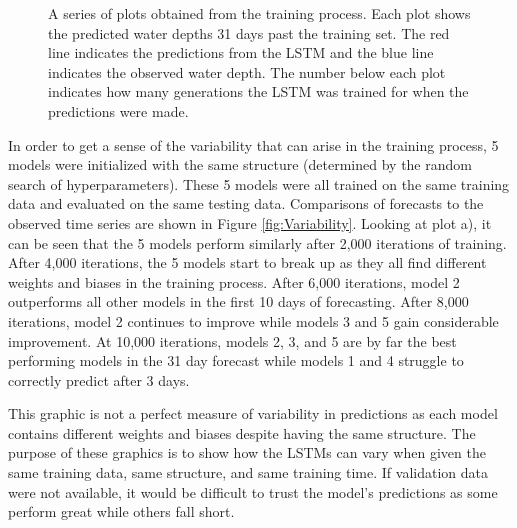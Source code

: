 \begin{figure}[ht]
    \caption{A series of plots obtained from the training process. Each plot shows the predicted water depths 31 days past the training set. The red line indicates the predictions from the LSTM and the blue line indicates the observed water depth. The number below each plot indicates how many generations the LSTM was trained for when the predictions were made.}
    \label{fig:Training}
\end{figure}

In order to get a sense of the variability that can arise in the training process, 5 models were initialized with the same structure (determined by the random search of hyperparameters). These 5 models were all trained on the same training data and evaluated on the same testing data. Comparisons of forecasts to the observed time series are shown in Figure \ref{fig:Variability}. Looking at plot a), it can be seen that the 5 models perform similarly after 2,000 iterations of training. After 4,000 iterations, the 5 models start to break up as they all find different weights and biases in the training process. After 6,000 iterations, model 2 outperforms all other models in the first 10 days of forecasting. After 8,000 iterations, model 2 continues to improve while models 3 and 5 gain considerable improvement. At 10,000 iterations, models 2, 3, and 5 are by far the best performing models in the 31 day forecast while models 1 and 4 struggle to correctly predict after 3 days. 

This graphic is not a perfect measure of variability in predictions as each model contains different weights and biases despite having the same structure. The purpose of these graphics is to show how the LSTMs can vary when given the same training data, same structure, and same training time. If validation data were not available, it would be difficult to trust the model's predictions as some perform great while others fall short. 

